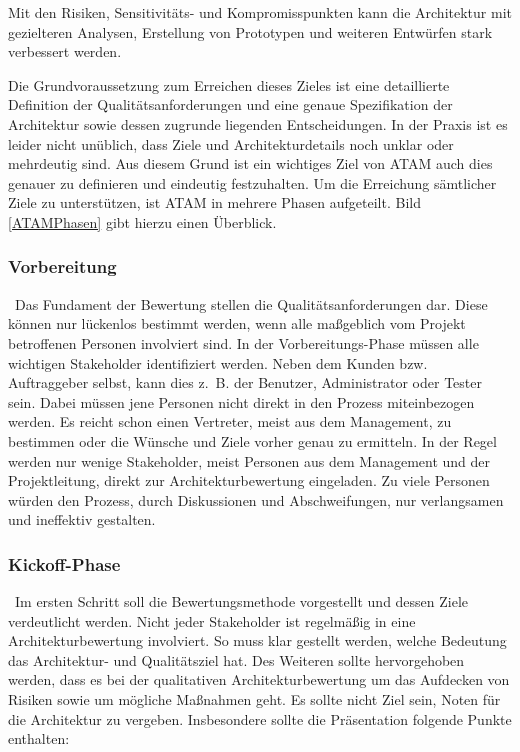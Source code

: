 Mit den Risiken, Sensitivitäts- und Kompromisspunkten kann die Architektur mit gezielteren Analysen, Erstellung von Prototypen und weiteren Entwürfen stark verbessert 
werden. 

Die Grundvoraussetzung zum Erreichen dieses Zieles ist eine detaillierte Definition der Qualitätsanforderungen und eine genaue Spezifikation der Architektur sowie
dessen zugrunde liegenden Entscheidungen\cite{Clements2000}. In der Praxis ist es leider nicht unüblich, dass Ziele und Architekturdetails noch unklar oder mehrdeutig sind. Aus diesem Grund ist ein wichtiges Ziel von \ac{ATAM} auch dies genauer zu definieren und eindeutig festzuhalten. Um die Erreichung sämtlicher Ziele zu unterstützen, ist \ac{ATAM} in 
mehrere Phasen aufgeteilt. Bild \ref{ATAMPhasen} gibt hierzu einen Überblick.


\subsubsection{Vorbereitung}
\
Das Fundament der Bewertung stellen die Qualitätsanforderungen dar. Diese können nur lückenlos bestimmt werden, wenn alle maßgeblich vom Projekt betroffenen Personen involviert sind. In der Vorbereitungs-Phase müssen alle wichtigen Stakeholder identifiziert werden. Neben dem Kunden bzw. Auftraggeber selbst, kann dies z.~B. der Benutzer, Administrator oder Tester sein. Dabei müssen jene Personen nicht direkt in den Prozess miteinbezogen werden. Es reicht schon einen Vertreter, meist aus dem Management, zu bestimmen oder die Wünsche und Ziele vorher genau zu ermitteln. In der Regel werden nur wenige Stakeholder, meist Personen aus dem Management und der Projektleitung\cite{Starke2015}, direkt zur Architekturbewertung eingeladen. Zu viele Personen würden den Prozess, durch Diskussionen und Abschweifungen, nur verlangsamen und ineffektiv gestalten.
\subsubsection{Kickoff-Phase}
\
Im ersten Schritt soll die Bewertungsmethode vorgestellt und dessen Ziele verdeutlicht werden. Nicht jeder Stakeholder ist regelmäßig in eine Architekturbewertung involviert. So muss klar gestellt werden, welche Bedeutung das Architektur- und Qualitätsziel hat\cite{Starke2015}. Des Weiteren sollte hervorgehoben werden, dass es bei der qualitativen Architekturbewertung um das Aufdecken von Risiken sowie um mögliche Maßnahmen geht. Es sollte nicht Ziel sein, Noten für die Architektur zu vergeben. Insbesondere sollte die Präsentation folgende Punkte enthalten\cite{Clements2000}:

